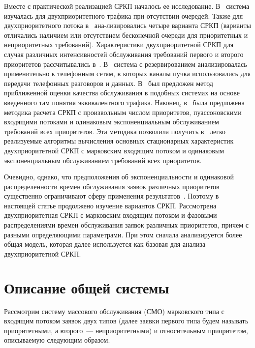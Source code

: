 \begin{multicols}{2}
Вместе с практической реализацией СРКП началось ее исследование.
В~\cite{4-p} система изучалась для двухприоритетного трафика при
отсутствии очередей.
Также для двухприоритетного потока в~\cite{9-p} ана-\linebreak лизировались
четыре варианта СРКП (варианты отличались наличием или отсутствием
бесконечной очереди для приоритетных и неприоритетных требований).
Характеристики двухприоритетной СРКП для случая различных
интенсивностей обслуживания требований первого и второго
приоритетов рассчитывались в~\cite{10-p}.
В~\cite{11-p} система с резервированием анализировалась
применительно к телефонным сетям, в которых каналы пучка
использовались для передачи телефонных разговоров и данных.
В~\cite{12-p} был предложен метод приближенной оценки качества
обслуживания в подобных системах на основе введенного там понятия
эквивалентного трафика.
Наконец, в~\cite{13-p} была предложена методика расчета СРКП с
произвольным числом приоритетов, пуассоновскими входящими потоками
и одинаковым экспоненциальным обслуживанием требований всех
приоритетов.
Эта методика позволила получить в~\cite{14-p} легко реализуемые
алгоритмы вычисления основных стационарных характеристик
двухприоритетной СРКП с марковским входящим потоком и одинаковым
экспоненциальным обслуживанием требований всех приоритетов.

Очевидно, однако, что  предположения об экспоненциальности и
одинаковой распределенности времен обслуживания заявок различных
приоритетов существенно ограничивают сферу применения результатов~\cite{13-p, 14-p}.
Поэтому в настоящей статье продолжено изучение вариантов СРКП.
Рас\-смот\-ре\-на двухприоритетная СРКП с марковским входящим потоком и
фазовыми распределениями времен обслуживания заявок различных
приоритетов, причем с разными определяющими параметрами.
При этом сначала анализируется более общая модель, которая далее
используется как базовая для анализа двухприоритетной СРКП.


\section{Описание общей системы}

Рассмотрим систему массового обслуживания (СМО) марковского типа с входящим потоком заявок двух
типов (далее заявки первого типа будем называть приоритетными,
а второго~--- неприоритетными) и относительным приоритетом,
описываемую следующим образом.


\end{multicols}
